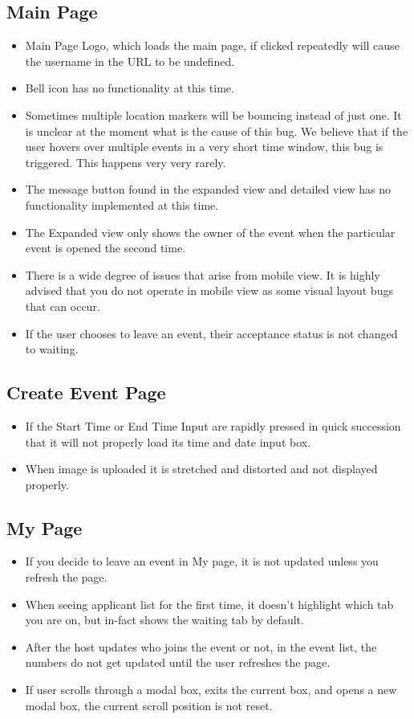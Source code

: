 \documentclass[10pt]{article}
\newcommand{\fancysub}[2] {{\color{primary}\subsection{#1} \label{sec:#2}}}
\begin{document}
		\fancysub{Main Page}{mainPage}
			\begin{itemize}
				\item Main Page Logo, which loads the main page, if clicked repeatedly will cause the username in the URL to be undefined.
				\item Bell icon has no functionality at this time.
				\item Sometimes multiple location markers will be bouncing instead of just one. It is unclear at the moment what is the cause of this bug. We believe that if the user hovers over multiple events in a very short time window, this bug is triggered. This happens very very rarely.
				\item The message button found in the expanded view and detailed view has no functionality implemented at this time.
				\item The Expanded view only shows the owner of the event when the particular event is opened the second time.
				\item There is a wide degree of issues that arise from mobile view. It is highly advised that you do not operate in mobile view as some visual layout bugs that can occur.
				\item If the user chooses to leave an event, their acceptance status is not changed to waiting.
			\end{itemize}
		\fancysub{Create Event Page}{createEvent}
			\begin{itemize}
				\item If the Start Time or End Time Input are rapidly pressed in quick succession that it will not properly load its time and date input box.
				\item When image is uploaded it is stretched and distorted and not displayed properly.
			\end{itemize}
		
		\fancysub{My Page}{mypage}
			\begin{itemize}
				\item If you decide to leave an event in My page, it is not updated unless you refresh the page.
				\item When seeing applicant list for the first time, it doesn't highlight which tab you are on, but in-fact shows the waiting tab by default.
				\item After the host updates who joins the event or not, in the event list, the numbers do not get updated until the user refreshes the page.
				\item If user scrolls through a modal box, exits the current box, and opens a new modal box, the current scroll position is not reset.
			\end{itemize}
	
\end{document}
